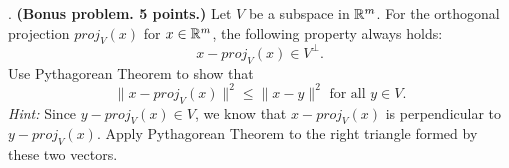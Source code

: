 \documentclass[12pt,a4paper]{article}
\newcommand{\gray}[1]{\textcolor{gray}{}}
\renewcommand{\l}{\left}
\renewcommand{\r}{\right}
\let\italiccorrection=\/
\def\/{\ifmmode\expandafter\frac\else\italiccorrection\fi}
\def\R{\ifmmode\mathbb R\fi}
\begin{document}
\gray{
    (a) 
    $$Q = \/12\l[
\begin{array}{cc}
    1& 1\\
    1& -1\\
    1& 1\\
    1& -1
\end{array}
\r], \quad
R = \l[
\begin{array}{cc}
    2& 10\\
    0& 2
\end{array}
\r]$$
The bonus problem follows from $A^TA = R^TR$.\\
}

\newpage
{}. \textbf{(Bonus problem. 5 points.)} Let $V$ be a subspace in $\R^m$. For the orthogonal projection $proj_V(x)$ for $x \in \R^m$, the following property always holds:
$$x - proj_V(x) \in V^\perp.$$
Use Pythagorean Theorem to show that 
$$\|x-proj_V(x)\|^2 \leq \|x - y\|^2 \mbox{ for all } y \in V.$$
\textit{Hint:} Since $y-proj_V(x) \in V$, we know that $x-proj_V(x)$ is perpendicular to $y - proj_V(x)$. Apply Pythagorean Theorem to the right triangle formed by these two vectors. 
\end{document}
